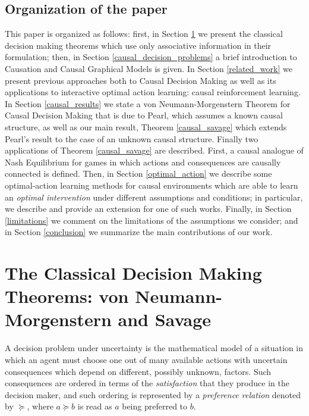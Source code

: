 \documentclass{svjour3}                     %
\begin{document}
\subsection{Organization of the paper}
\label{organization}
This paper is organized as follows: first, in Section \ref{classical_theorems} we present the classical decision making theorems which use only associative information in their formulation; then, in Section \ref{causal_decision_problems} a brief introduction to Causation and Causal Graphical Models is given. In Section \ref{related_work}  we present previous approaches both to Causal Decision Making as well as its applications to interactive optimal action learning: causal reinforcement learning. In Section \ref{causal_results} we state a von Neumann-Morgenstern Theorem for Causal Decision Making that is due to Pearl, which assumes a known causal structure, as well as our main result, Theorem \ref{causal_savage} which extends Pearl's result to the case of an unknown causal structure. Finally two applications of Theorem \ref{causal_savage} are described. First, a causal analogue of Nash Equilibrium for games in which actions and consequences are causally connected is defined. Then, in Section \ref{optimal_action} we describe some optimal-action learning methods for causal environments which are able to learn an \textit{optimal intervention} under different assumptions and conditions; in particular, we describe and provide an extension for one of such works. Finally, in Section \ref{limitations} we comment on the limitations of the assumptions we consider;  and in Section \ref{conclusion} we summarize the main contributions of our work.

\section{The Classical Decision Making Theorems: von Neumann-Morgenstern and Savage}
\label{classical_theorems}
A decision problem under uncertainty is the mathematical model of a situation in which an agent must choose one out of many available actions with uncertain consequences which depend on different, possibly unknown, factors. Such consequences are ordered in terms of the \textit{satisfaction} that they produce in the decision maker, and such ordering is represented by a \textit{preference relation} denoted by $\succeq$, where $a \succeq b$ is read as $a$ being preferred to $b$.
\end{document}
